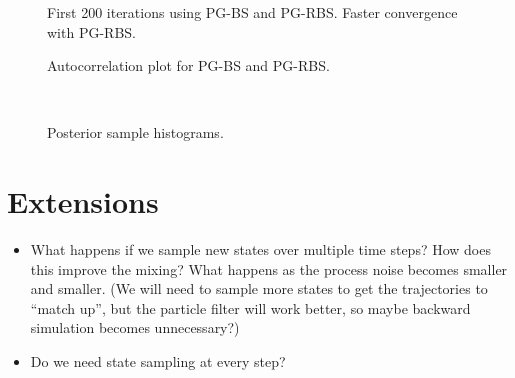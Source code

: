 \documentclass{article}
\begin{document}
\begin{figure}
\centering

\caption{First 200 iterations using PG-BS and PG-RBS. Faster convergence with PG-RBS.}
\label{fig:chain_init}
\end{figure}

\begin{figure}
\centering

\caption{Autocorrelation plot for PG-BS and PG-RBS.}
\label{fig:acf}
\end{figure}

\begin{figure}
\centering
\subfloat[PG-BS (N=100)]{  }
\subfloat[PG-BS (N=200)]{  } \\
\subfloat[PG-RBS (N=100)]{  }
\caption{Posterior sample histograms.}
\label{fig:sample_hist}
\end{figure}


\section{Extensions}
\begin{itemize}
 \item What happens if we sample new states over multiple time steps? How does this improve the mixing? What happens as the process noise becomes smaller and smaller. (We will need to sample more states to get the trajectories to ``match up'', but the particle filter will work better, so maybe backward simulation becomes unnecessary?)
 \item Do we need state sampling at every step?
\end{itemize}






\end{document}
